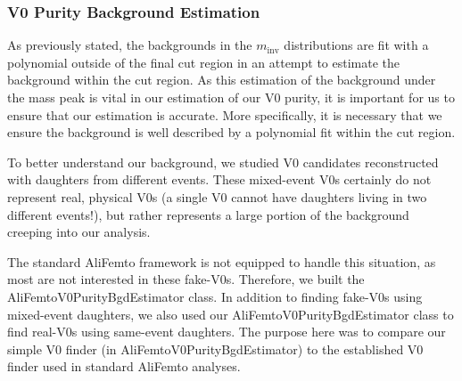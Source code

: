 \documentclass[../AnalysisNoteJBuxton.tex]{subfiles}
\begin{document}
\subsubsection{V0 Purity Background Estimation}
\label{V0PurBgdEst}

As previously stated, the backgrounds in the $m_{\mathrm{inv}}$ distributions are fit with a polynomial outside of the final cut region in an attempt to estimate the background within the cut region.  As this estimation of the background under the mass peak is vital in our estimation of our V0 purity, it is important for us to ensure that our estimation is accurate.  More specifically, it is necessary that we ensure the background is well described by a polynomial fit within the cut region.

To better understand our background, we studied V0 candidates reconstructed with daughters from different events.  These mixed-event V0s certainly do not represent real, physical V0s (a single V0 cannot have daughters living in two different events!), but rather represents a large portion of the background creeping into our analysis.

The standard AliFemto framework is not equipped to handle this situation, as most are not interested in these fake-V0s.  Therefore, we built the AliFemtoV0PurityBgdEstimator class.  In addition to finding fake-V0s using mixed-event daughters, we also used our AliFemtoV0PurityBgdEstimator class to find real-V0s using same-event daughters.  The purpose here was to compare our simple V0 finder (in AliFemtoV0PurityBgdEstimator) to the established V0 finder used in standard AliFemto analyses.
\end{document}
